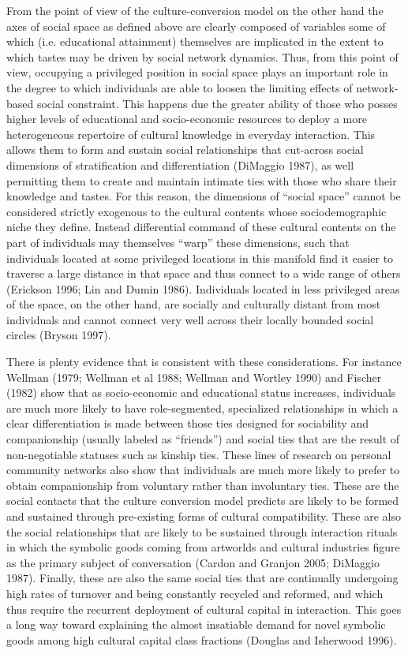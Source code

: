 From the point of view of the culture-conversion model on the other hand the axes of social space as defined above are clearly composed of variables some of which (i.e. educational attainment) themselves are implicated in the extent to which tastes may be driven by social network dynamics. Thus, from this point of view, occupying a privileged position in social space plays an important role in the degree to which individuals are able to loosen the limiting effects of network-based social constraint. This happens due the greater ability of those who posses higher levels of educational and socio-economic resources to deploy a more heterogeneous repertoire of cultural knowledge in everyday interaction. This allows them to form and sustain social relationships that cut-across social dimensions of stratification and differentiation (DiMaggio 1987), as well permitting them to create and maintain intimate ties with those who share their knowledge and tastes. For this reason, the dimensions of ``social space'' cannot be considered strictly exogenous to the cultural contents whose sociodemographic niche they define. Instead differential command of these cultural contents on the part of individuals may themselves ``warp'' these dimensions, such that individuals located at some privileged locations in this manifold find it easier to traverse a large distance in that space and thus connect to a wide range of others (Erickson 1996; Lin and Dumin 1986). Individuals located in less privileged areas of the space, on the other hand, are socially and culturally distant from most individuals and cannot connect very well across their locally bounded social circles (Bryson 1997).

There is plenty evidence that is consistent with these considerations. For instance Wellman (1979; Wellman et al 1988; Wellman and Wortley 1990) and Fischer (1982) show that as socio-economic and educational status increases, individuals are much more likely to have role-segmented, specialized relationships in which a clear differentiation is made between those ties designed for sociability and companionship (usually labeled as ``friends'') and social ties that are the result of non-negotiable statuses such as kinship ties. These lines of research on personal community networks also show that individuals are much more likely to prefer to obtain companionship from voluntary rather than involuntary ties. These are the social contacts that the culture conversion model predicts are likely to be formed and sustained through pre-existing forms of cultural compatibility. These are also the social relationships that are likely to be sustained through interaction rituals in which the symbolic goods coming from artworlds and cultural industries figure as the primary subject of conversation (Cardon and Granjon 2005; DiMaggio 1987). Finally, these are also the same social ties that are continually undergoing high rates of turnover and being constantly recycled and reformed, and which thus require the recurrent deployment of cultural capital in interaction. This goes a long way toward explaining the almost insatiable demand for novel symbolic goods among high cultural capital class fractions (Douglas and Isherwood 1996).

